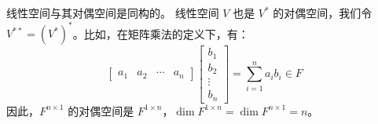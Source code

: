 \begin{note}
    线性空间与其对偶空间是同构的。
    线性空间 $V$ 也是 $V^*$ 的对偶空间，我们令 $V^{**} = (V^*)^*$。比如，在矩阵乘法的定义下，有：
    \[
        \begin{bmatrix}
            a_1 & a_2 & \cdots & a_n
        \end{bmatrix}\begin{bmatrix}
            b_1 \\ b_2 \\ \vdots \\ b_n
        \end{bmatrix} = \sum_{i=1}^{n} a_i b_i \in F
    \]
    因此，$F^{n\times 1}$ 的对偶空间是 $F^{1\times n}$，$\dim F^{1\times n} = \dim F^{n\times 1} = n$。
\end{note}

\newpage